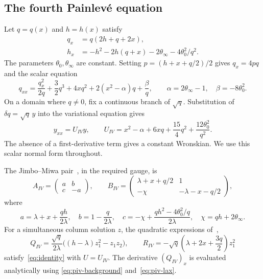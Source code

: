 \subsection{The fourth Painlev\'e equation}
Let $q=q(x)$ and $h=h(x)$ satisfy
\begin{equation}\label{eq:piv-background}
 \begin{split}
 q_x&=q(2h+q+2x),\\
 h_x&=-h^2-2h(q+x)-2\theta_\infty-4\theta_0^2/q^2.
 \end{split}
\end{equation}
The parameters $\theta_0,\theta_\infty$ are constant.
Setting $p=(h+x+q/2)/2$ gives $q_x=4pq$ and the scalar equation
\begin{equation*}
 q_{xx}=\frac{q_x^2}{2q}+\frac32q^3+4xq^2+2(x^2-\alpha)q+\frac\beta q,
 \qquad \alpha=2\theta_\infty-1,\quad\beta=-8\theta_0^2.
\end{equation*}
On a domain where $q\ne0$, fix a continuous branch of $\sqrt q$.
Substitution of $\delta q=\sqrt q\,y$ into the variational equation gives
\begin{equation*}
 y_{xx}=U_{IV}y,\qquad
 U_{IV}=x^2-\alpha+6xq+\frac{15}{4}q^2+\frac{12\theta_0^2}{q^2}.
\end{equation*}
The absence of a first-derivative term gives a constant Wronskian.
We use this scalar normal form throughout.

The Jimbo--Miwa pair~\cite{JimboMiwa81}, in the required gauge, is
\begin{equation}\label{eq:piv-lax}
 A_{IV}=\begin{pmatrix}a&b\\c&-a\end{pmatrix},\qquad
 B_{IV}=\begin{pmatrix}\lambda+x+q/2&1\\-\chi&-\lambda-x-q/2\end{pmatrix},
\end{equation}
where
\begin{equation*}
 a=\lambda+x+\frac{qh}{2\lambda},\quad
 b=1-\frac q{2\lambda},\quad
 c=-\chi+\frac{qh^2-4\theta_0^2/q}{2\lambda},\quad
 \chi=qh+2\theta_\infty.
\end{equation*}
For a simultaneous column solution $z$, the quadratic expressions
of~\cite{Kiselev26},
\begin{equation}\label{eq:piv-kernel}
 Q_{IV}=\frac{\sqrt q}{2\lambda}\bigl((h-\lambda)z_1^2-z_1z_2\bigr),
 \qquad R_{IV}=-\sqrt q\left(\lambda+2x+\frac{3q}{2}\right)z_1^2
\end{equation}
satisfy~\eqref{eq:identity} with $U=U_{IV}$.
The derivative $(Q_{IV})_x$ is evaluated analytically using
\eqref{eq:piv-background} and~\eqref{eq:piv-lax}.

